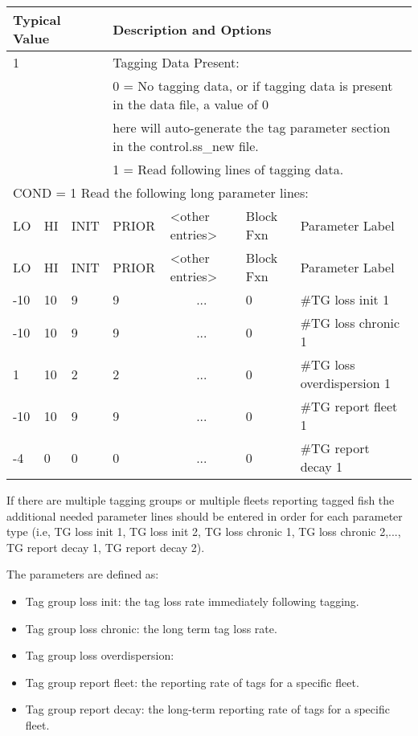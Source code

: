 \begin{longtable}{p{1cm} p{1cm} p{1cm}  p{1.5cm}  p{2.9cm}  p{1.25cm}  p{4.25cm} }
	\hline
	\multicolumn{3}{l}{Typical Value} &  \multicolumn{4}{l}{Description and Options}\Tstrut\Bstrut\\
	\hline
	\multicolumn{3}{l}{1} &  \multicolumn{4}{l}{Tagging Data Present:} \Tstrut\\
	\multicolumn{3}{l}{}  &  \multicolumn{4}{l}{0 = No tagging data, or if tagging data is present in the data file, a value of 0} \\
	\multicolumn{3}{l}{}  &  \multicolumn{4}{l}{ here will auto-generate the tag parameter section in the control.ss\_new file.}\\
	\multicolumn{3}{l}{}  &  \multicolumn{4}{l}{1 = Read following lines of tagging data.} \Bstrut\\


	\multicolumn{7}{l}{COND = 1 Read the following long parameter lines:}\Tstrut\\
	\hline
	LO \Tstrut & HI & INIT & PRIOR &  <other entries> & Block Fxn & Parameter Label\Bstrut\\
	\hline
	\endfirsthead

	\hline
	LO \Tstrut & HI & INIT & PRIOR & <other entries> & Block Fxn & Parameter Label\Bstrut\\
	\hline
	\endhead

	\hline
	\endfoot
	\endlastfoot

	-10 & 10 & 9 & 9 & \multicolumn{1}{c}{...} & 0 & \#TG loss init 1\Tstrut\\
	-10 & 10 & 9 & 9 & \multicolumn{1}{c}{...} & 0 & \#TG loss chronic 1\\
	  1 & 10 & 2 & 2 & \multicolumn{1}{c}{...} & 0 & \#TG loss overdispersion 1\\
	-10 & 10 & 9 & 9 & \multicolumn{1}{c}{...} & 0 & \#TG report fleet 1\\
	 -4 &  0 & 0 & 0 & \multicolumn{1}{c}{...} & 0 & \#TG report decay 1\Bstrut\\
	 \hline
\end{longtable}

If there are multiple tagging groups or multiple fleets reporting tagged fish the additional needed parameter lines should be entered in order for each parameter type (i.e, TG loss init 1, TG loss init 2, TG loss chronic 1, TG loss chronic 2,..., TG report decay 1, TG report decay 2). 

The parameters are defined as:
\begin{itemize}
	\item Tag group loss init: the tag loss rate immediately following tagging.
	\item Tag group loss chronic: the long term tag loss rate.
	\item Tag group loss overdispersion: 
	\item Tag group report fleet: the reporting rate of tags for a specific fleet.
	\item Tag group report decay: the long-term reporting rate of tags for a specific fleet.
\end{itemize}

